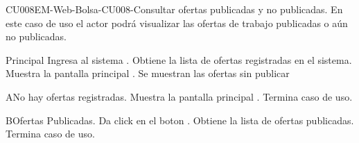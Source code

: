 


	\begin{UseCase}{CU008}{EM-Web-Bolsa-CU008-Consultar ofertas publicadas y no publicadas.}{
		En este caso de uso el actor  podrá visualizar las ofertas de trabajo publicadas o aún no publicadas.}


	\end{UseCase}
	\newpage
	
	\begin{UCtrayectoria}{Principal}
	\UCpaso[\UCactor] Ingresa al sistema .
	\UCpaso Obtiene la lista de ofertas registradas en el sistema.
	\UCpaso Muestra la pantalla principal .    
	\UCpaso Se muestran las ofertas sin publicar 
		\end{UCtrayectoria}
		
\begin{UCtrayectoriaA}{A}{No hay ofertas registradas.}
	\UCpaso Muestra la pantalla principal .   
	\UCpaso Termina caso de uso.
\end{UCtrayectoriaA}
	
\begin{UCtrayectoriaB}{B}{Ofertas Publicadas.}
	\UCpaso[\UCactor] Da click en el boton .  
	\UCpaso Obtiene la lista de ofertas publicadas.
	\UCpaso Termina caso de uso.
\end{UCtrayectoriaB}


